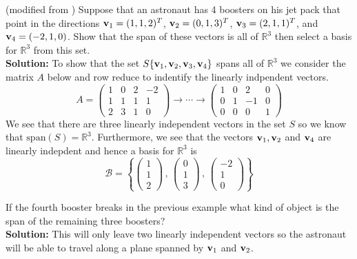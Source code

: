 \begin{example}
    (modified from \cite{Woodruff})  
    Suppose that an astronaut has 4 boosters on his jet pack that
    point in the directions ${\bf v}_1 = (1,1,2)^T$, ${\bf v}_2 = (0,1,3)^T$, ${\bf v}_3 = (2,1,1)^T$,
    and ${\bf v}_4 = (-2,1,0)$.  Show that the span of these vectors is all of $\mathbb{R}^3$
    then select a basis for $\mathbb{R}^3$ from this set.\\
    {\bf Solution: } To show that the set $S \{{\bf v}_1,{\bf v}_2,{\bf v}_3, {\bf v}_4\}$ spans all of
    $\mathbb{R}^3$ we consider the matrix $A$ below and row reduce to indentify the
    linearly indpendent vectors.
    \[ A = \begin{pmatrix} 1 & 0 & 2 & -2 \\ 1 & 1 & 1 & 1 \\ 2 & 3 & 1 & 0 \end{pmatrix}
        \to \cdots \to \begin{pmatrix} 1 & 0 & 2 & 0 \\ 0 & 1 & -1 & 0 \\ 0 & 0 & 0 & 1 \end{pmatrix} 
    \]
    We see that there are three linearly independent vectors in the set $S$ so we know
    that $\text{span}(S) = \mathbb{R}^3$.  Furthermore, we see that the vectors ${\bf v}_1,
    {\bf v}_2$ and ${\bf v}_4$ are linearly indepdent and hence a basis for $\mathbb{R}^3$ is 
    \[ \mathcal{B} = \left\{ \begin{pmatrix} 1 \\ 1 \\ 2 \end{pmatrix} \, , \,
        \begin{pmatrix} 0 \\ 1 \\ 3 \end{pmatrix} \, , \, \begin{pmatrix} -2 \\ 1 \\ 0
    \end{pmatrix} \right\} \]
\end{example}

\begin{example}
    If the fourth booster breaks in the previous example what kind of object is the span
    of the remaining three boosters? \\
    {\bf Solution: } This will only leave two linearly independent vectors so the
    astronaut will be able to travel along a plane spanned by ${\bf v}_1$ and ${\bf v}_2$. 
\end{example}


